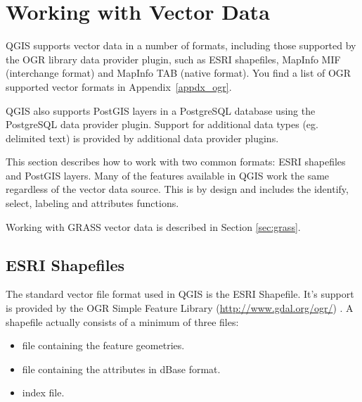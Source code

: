 
\section{Working with Vector Data}\label{label_workingvector}

\updatedisclaimer


QGIS supports vector data in a number of formats, including those
supported by the OGR library data provider plugin, such as ESRI shapefiles,
MapInfo MIF (interchange format)
and MapInfo TAB (native format).
You find a list of OGR supported vector formats in Appendix~\ref{appdx_ogr}.

QGIS also supports PostGIS layers 
in a PostgreSQL database using the PostgreSQL data provider plugin.
Support for additional data types (eg. delimited text) is provided by 
additional data provider plugins.

This section describes how to work with two common formats:
ESRI shapefiles and PostGIS layers. Many of the
features available in QGIS work the same regardless of the vector data source.
This is by design and includes the identify, select, labeling and attributes
functions.

Working with GRASS vector data is described in Section \ref{sec:grass}.

\subsection{ESRI Shapefiles}

The standard vector file format used in QGIS is the ESRI Shapefile. It's support 
is provided by the OGR Simple Feature Library (\url{http://www.gdal.org/ogr/})
. A shapefile actually consists of a minimum of three files:

\begin{itemize}
\item {} file containing the feature geometries.
\item {} file containing the attributes in dBase format.
\item {} index file.
\end{itemize}

